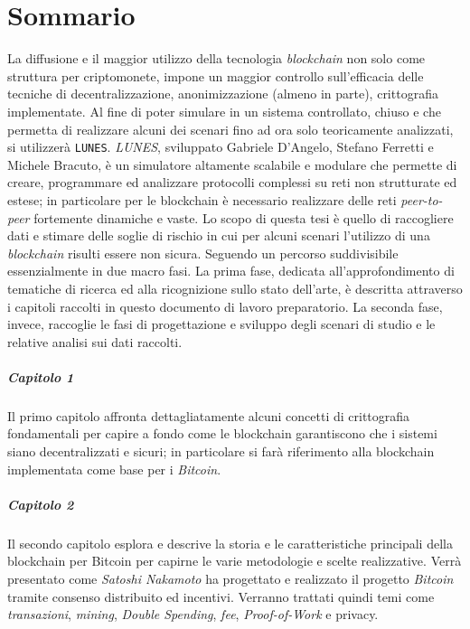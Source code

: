 \chapter*{Sommario}
La diffusione e il maggior utilizzo della tecnologia \textit{blockchain} non solo come struttura per criptomonete, impone un maggior controllo sull'efficacia delle tecniche di decentralizzazione, anonimizzazione (almeno in parte), crittografia implementate.\newline
Al fine di poter simulare in un sistema controllato, chiuso e che permetta di realizzare alcuni dei scenari fino ad ora solo teoricamente analizzati, si utilizzerà \texttt{LUNES}\cite{gdalunes}.\newline
\textit{LUNES}, sviluppato Gabriele D'Angelo, Stefano Ferretti e Michele Bracuto, è un simulatore altamente scalabile e modulare che permette di creare, programmare ed analizzare protocolli complessi su reti non strutturate ed estese; in particolare per le blockchain è necessario realizzare delle reti \textit{peer-to-peer} fortemente dinamiche e vaste.\newline
Lo scopo di questa tesi è quello di raccogliere dati e stimare delle soglie di rischio in cui per alcuni scenari l'utilizzo di una \textit{blockchain} risulti essere non sicura.\newline\newline
Seguendo un percorso suddivisibile essenzialmente in due macro fasi. La prima fase, dedicata all'approfondimento di tematiche di ricerca ed alla ricognizione sullo stato dell'arte, è descritta attraverso i capitoli raccolti in questo documento di lavoro preparatorio. La seconda fase, invece, raccoglie le fasi di progettazione e sviluppo degli scenari di studio e le relative analisi sui dati raccolti.\newline

\paragraph{Capitolo 1}
Il primo capitolo affronta dettagliatamente alcuni concetti di crittografia fondamentali per capire a fondo come le blockchain garantiscono che i sistemi siano decentralizzati e sicuri; in particolare si farà riferimento alla blockchain implementata come base per i \textit{Bitcoin}.

\paragraph{Capitolo 2}
Il secondo capitolo esplora e descrive la storia e le caratteristiche principali della blockchain per Bitcoin per capirne le varie metodologie e scelte realizzative. Verrà presentato come \textit{Satoshi Nakamoto} ha progettato e realizzato il progetto \textit{Bitcoin} tramite consenso distribuito ed incentivi. Verranno trattati quindi temi come \textit{transazioni}, \textit{mining}, \textit{Double Spending}, \textit{fee}, \textit{Proof-of-Work} e privacy.


